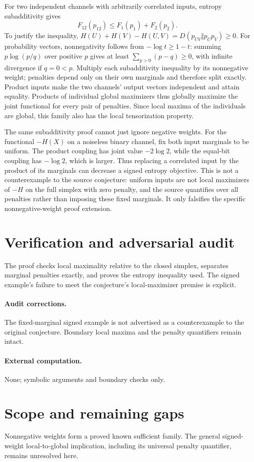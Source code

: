 \documentclass[11pt]{article}
\begin{document}
For two independent channels with arbitrarily correlated inputs, entropy subadditivity gives
\[
F_{12}(p_{12})\le F_1(p_1)+F_2(p_2).
\]
To justify the inequality, $H(U)+H(V)-H(U,V)=D(p_{UV}\Vert p_Up_V)\ge0$. For probability vectors, nonnegativity follows from $-\log t\ge1-t$: summing $p\log(p/q)$ over positive $p$ gives at least $\sum_{p>0}(p-q)\ge0$, with infinite divergence if $q=0<p$. Multiply each subadditivity inequality by its nonnegative weight; penalties depend only on their own marginals and therefore split exactly. Product inputs make the two channels' output vectors independent and attain equality. Products of individual global maximizers thus globally maximize the joint functional for every pair of penalties. Since local maxima of the individuals are global, this family also has the local tensorization property.

The same subadditivity proof cannot just ignore negative weights. For the functional $-H(X)$ on a noiseless binary channel, fix both input marginals to be uniform. The product coupling has joint value $-2\log2$, while the equal-bit coupling has $-\log2$, which is larger. Thus replacing a correlated input by the product of its marginals can decrease a signed entropy objective. This is not a counterexample to the source conjecture: uniform inputs are not local maximizers of $-H$ on the full simplex with zero penalty, and the source quantifies over all penalties rather than imposing these fixed marginals. It only falsifies the specific nonnegative-weight proof extension.
\section{Verification and adversarial audit}
The proof checks local maximality relative to the closed simplex, separates marginal penalties exactly, and proves the entropy inequality used. The signed example's failure to meet the conjecture's local-maximizer premise is explicit.
\paragraph{Audit corrections.} The fixed-marginal signed example is not advertised as a counterexample to the original conjecture. Boundary local maxima and the penalty quantifiers remain intact.
\paragraph{External computation.} None; symbolic arguments and boundary checks only.
\section{Scope and remaining gaps}
Nonnegative weights form a proved known sufficient family. The general signed-weight local-to-global implication, including its universal penalty quantifier, remains unresolved here.
\end{document}
